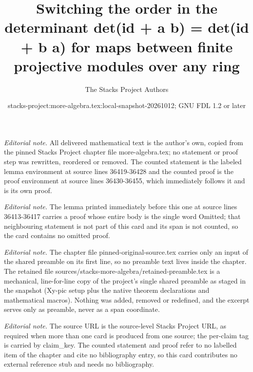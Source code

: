 \documentclass[10pt,a4paper]{amsart}
\title{Switching the order in the determinant det(id + a b) = det(id + b a) for maps between finite projective modules over any ring}
\author{The Stacks Project Authors}
\date{stacks-project:more-algebra.tex:local-snapshot-20261012; GNU FDL 1.2 or later}
\theoremstyle{plain}
\theoremstyle{definition}
\theoremstyle{remark}
\numberwithin{equation}{subsection}
\begin{document}
\maketitle
\setcounter{subsection}{1}
\noindent\textit{Editorial note.} All delivered mathematical text is the author's own, copied from the pinned Stacks Project chapter file more-algebra.tex; no statement or proof step was rewritten, reordered or removed. The counted statement is the labeled lemma environment at source lines 36419-36428 and the counted proof is the proof environment at source lines 36430-36455, which immediately follows it and is its own proof.\par\medskip
\noindent\textit{Editorial note.} The lemma printed immediately before this one at source lines 36413-36417 carries a proof whose entire body is the single word Omitted; that neighbouring statement is not part of this card and its span is not counted, so the card contains no omitted proof.\par\medskip
\noindent\textit{Editorial note.} The chapter file pinned-original-source.tex carries only an input of the shared preamble on its first line, so no preamble text lives inside the chapter. The retained file sources/stacks-more-algebra/retained-preamble.tex is a mechanical, line-for-line copy of the project's single shared preamble as staged in the snapshot (Xy-pic setup plus the native theorem declarations and mathematical macros). Nothing was added, removed or redefined, and the excerpt serves only as preamble, never as a span coordinate.\par\medskip
\noindent\textit{Editorial note.} The source URL is the source-level Stacks Project URL, as required when more than one card is produced from one source; the per-claim tag is carried by claim\_key. The counted statement and proof refer to no labelled item of the chapter and cite no bibliography entry, so this card contributes no external reference stub and needs no bibliography.\par\medskip
\end{document}
